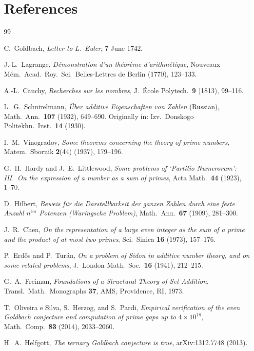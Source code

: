 \documentclass[12pt,a4paper]{amsart}
\theoremstyle{definition}
\begin{document}
\section*{References}\label{sec:references}

\begin{thebibliography}{99}

C.\ Goldbach,
\textit{Letter to L.\ Euler}, 7 June 1742.

J.-L.\ Lagrange,
\textit{D\'{e}monstration d'un th\'{e}or\`{e}me d'arithm\'{e}tique},
Nouveaux M\'{e}m.\ Acad.\ Roy.\ Sci.\ Belles-Lettres de Berlin (1770), 123--133.

A.-L.\ Cauchy,
\textit{Recherches sur les nombres},
J.\ \'{E}cole Polytech.\ \textbf{9} (1813), 99--116.

L.\ G.\ Schnirelmann,
\textit{\"{U}ber additive Eigenschaften von Zahlen}
(Russian), Math.\ Ann.\ \textbf{107} (1932), 649--690.
Originally in: Izv.\ Donskogo Politekhn.\ Inst.\ \textbf{14} (1930).

I.\ M.\ Vinogradov,
\textit{Some theorems concerning the theory of prime numbers},
Matem.\ Sbornik \textbf{2}(44) (1937), 179--196.

G.\ H.\ Hardy and J.\ E.\ Littlewood,
\textit{Some problems of `Partitio Numerorum': III.\ On the expression of
a number as a sum of primes},
Acta Math.\ \textbf{44} (1923), 1--70.

D.\ Hilbert,
\textit{Beweis f\"{u}r die Darstellbarkeit der ganzen Zahlen durch eine
feste Anzahl $n^{\text{ter}}$ Potenzen (Waringsche Problem)},
Math.\ Ann.\ \textbf{67} (1909), 281--300.

J.\ R.\ Chen,
\textit{On the representation of a large even integer as the sum of a
prime and the product of at most two primes},
Sci.\ Sinica \textbf{16} (1973), 157--176.

P.\ Erd\H{o}s and P.\ Tur\'{a}n,
\textit{On a problem of Sidon in additive number theory, and on some
related problems},
J.\ London Math.\ Soc.\ \textbf{16} (1941), 212--215.

G.\ A.\ Freiman,
\textit{Foundations of a Structural Theory of Set Addition},
Transl.\ Math.\ Monographs \textbf{37}, AMS, Providence, RI, 1973.

T.\ Oliveira e Silva, S.\ Herzog, and S.\ Pardi,
\textit{Empirical verification of the even Goldbach conjecture and
computation of prime gaps up to $4 \times 10^{18}$},
Math.\ Comp.\ \textbf{83} (2014), 2033--2060.

H.\ A.\ Helfgott,
\textit{The ternary Goldbach conjecture is true},
arXiv:1312.7748 (2013).

\end{thebibliography}
\end{document}

